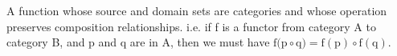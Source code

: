 A function whose source and domain sets are categories and whose operation 
preserves composition relationships. i.e. if f is a functor from category
A to category B, and p and q are in A, then we must have 
$ \mathrm{f(p} \circ \mathrm{q)=f(p)} \circ \mathrm{f(q)} . $